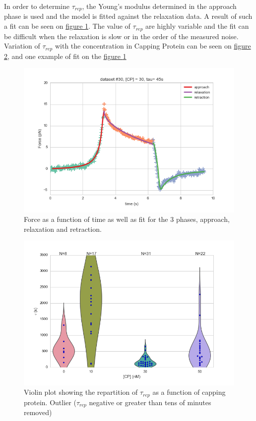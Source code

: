 \documentclass[A4paperpaper,11pt,english]{sphinxmanual}
\begin{document}
In order to determine \(\tau_{rep}\), the Young's modulus determined in the
approach phase is used and the model is fitted against the relaxation data.  A
result of such a fit can be seen on \hyperref[index-latex:fit-3-phases]{figure  \ref*{index-latex:fit-3-phases}}. The value of
\(\tau_{rep}\) are highly variable and the fit can be difficult when the relaxation is
slow or in the order of the measured noise. Variation of \(\tau_{rep}\) with the
concentration in Capping Protein can be seen on \hyperref[index-latex:tau-violin]{figure  \ref*{index-latex:tau-violin}}, and
one example of fit on the \hyperref[index-latex:fit-3-phases]{figure  \ref*{index-latex:fit-3-phases}}
\begin{figure}[htbp]
\centering
\capstart

\includegraphics[width=0.800\linewidth]{3phases.png}
\caption{Force as a function of time as well as fit for the 3 phases, approach,
relaxation and retraction.}\label{index-latex:fit-3-phases}\end{figure}
\begin{figure}[htbp]
\centering
\capstart

\includegraphics[width=0.800\linewidth]{tau_violin.png}
\caption{Violin plot showing the repartition of \(\tau_{rep}\) as a function of capping
protein. Outlier (\(\tau_{rep}\) negative or greater than tens of minutes removed)}\label{index-latex:tau-violin}\end{figure}
\end{document}

